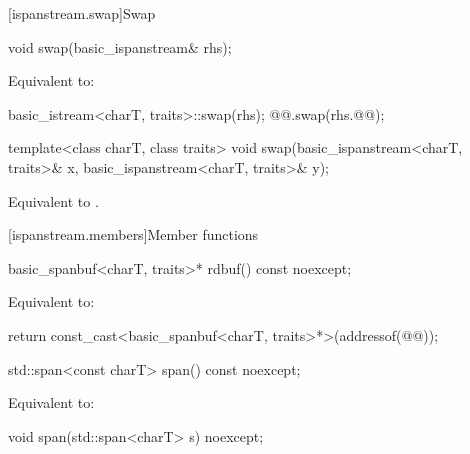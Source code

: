 [ispanstream.swap]{Swap}

%
\begin{itemdecl}
void swap(basic_ispanstream& rhs);
\end{itemdecl}

\begin{itemdescr}
\pnum
\effects
Equivalent to:
\begin{codeblock}
basic_istream<charT, traits>::swap(rhs);
@@.swap(rhs.@@);
\end{codeblock}
\end{itemdescr}

%
\begin{itemdecl}
template<class charT, class traits>
  void swap(basic_ispanstream<charT, traits>& x, basic_ispanstream<charT, traits>& y);
\end{itemdecl}

\begin{itemdescr}
\pnum
\effects
Equivalent to  .
\end{itemdescr}

[ispanstream.members]{Member functions}

%
\begin{itemdecl}
basic_spanbuf<charT, traits>* rdbuf() const noexcept;
\end{itemdecl}

\begin{itemdescr}
\pnum
\effects
Equivalent to:
\begin{codeblock}
return const_cast<basic_spanbuf<charT, traits>*>(addressof(@@));
\end{codeblock}
\end{itemdescr}

%
\begin{itemdecl}
std::span<const charT> span() const noexcept;
\end{itemdecl}

\begin{itemdescr}
\pnum
\effects
Equivalent to: 
\end{itemdescr}

%
\begin{itemdecl}
void span(std::span<charT> s) noexcept;
\end{itemdecl}

